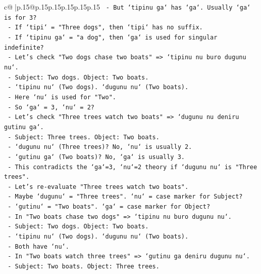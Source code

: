 \documentclass{article}
\begin{document}
{\begin{supertabular}{c@{$\;$}|p{.15\linewidth}@{}p{.15\linewidth}p{.15\linewidth}p{.15\linewidth}p{.15\linewidth}p{.15\linewidth}}
{{{\texttt{           {-} But `tipinu ga` has `ga`. Usually `ga` is for 3?} \\
\texttt{           {-} If `tipi` = "Three dogs", then `tipi` has no suffix.} \\
\texttt{           {-} If `tipinu ga` = "a dog", then `ga` is used for singular indefinite?} \\
\texttt{           {-} Let's check "Two dogs chase two boats" => `tipinu nu buro dugunu nu`.} \\
\texttt{             {-} Subject: Two dogs. Object: Two boats.} \\
\texttt{             {-} `tipinu nu` (Two dogs). `dugunu nu` (Two boats).} \\
\texttt{             {-} Here `nu` is used for "Two".} \\
\texttt{           {-} So `ga` = 3, `nu` = 2?} \\
\texttt{           {-} Let's check "Three trees watch two boats" => `dugunu nu deniru gutinu ga`.} \\
\texttt{             {-} Subject: Three trees. Object: Two boats.} \\
\texttt{             {-} `dugunu nu` (Three trees)? No, `nu` is usually 2.} \\
\texttt{             {-} `gutinu ga` (Two boats)? No, `ga` is usually 3.} \\
\texttt{             {-} This contradicts the `ga`=3, `nu`=2 theory if `dugunu nu` is "Three trees".} \\
\texttt{             {-} Let's re{-}evaluate "Three trees watch two boats".} \\
\texttt{               {-} Maybe `dugunu` = "Three trees". `nu` = case marker for Subject?} \\
\texttt{               {-} `gutinu` = "Two boats". `ga` = case marker for Object?} \\
\texttt{               {-} In "Two boats chase two dogs" => `tipinu nu buro dugunu nu`.} \\
\texttt{                 {-} Subject: Two dogs. Object: Two boats.} \\
\texttt{                 {-} `tipinu nu` (Two dogs). `dugunu nu` (Two boats).} \\
\texttt{                 {-} Both have `nu`.} \\
\texttt{               {-} In "Two boats watch three trees" => `gutinu ga deniru dugunu nu`.} \\
\texttt{                 {-} Subject: Two boats. Object: Three trees.} \\
}}}
\end{supertabular}}
\end{document}
